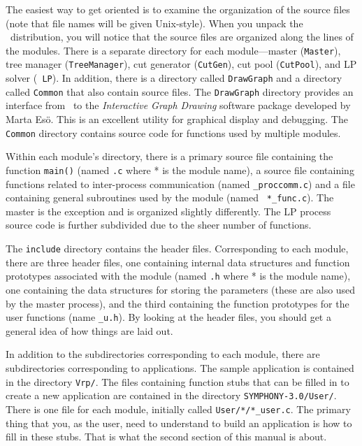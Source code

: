 The easiest way to get oriented is to examine the organization of the source
files (note that file names will be given Unix-style). When you unpack the
\BB\ distribution, you will notice that the source files are organized along
the lines of the modules.  There is a separate directory for each
module---master ({\tt Master}), tree manager ({\tt TreeManager}), cut
generator ({\tt CutGen}), cut pool ({\tt CutPool}), and LP solver ({\tt
LP}). In addition, there is a directory called {\tt DrawGraph} and a directory
called {\tt Common} that also contain source files. The {\tt DrawGraph}
directory provides an interface from \BB\ to the {\em Interactive Graph
Drawing} software package developed by Marta Es\"o. This is an excellent
utility for graphical display and debugging. The {\tt Common} directory
contains source code for functions used by multiple modules.

Within each module's directory, there is a primary source file
containing the function {\tt main()} (named {\tt *.c} where * is the
module name), a source file containing functions related to
inter-process communication (named {\tt *\_proccomm.c}) and a file
containing general subroutines used by the module (named {\tt
*\_func.c}). The master is the exception and is organized slightly
differently. The LP process source code is further subdivided due to
the sheer number of functions.

The {\tt include} directory contains the header files. Corresponding
to each module, there are three header files, one containing internal
data structures and function prototypes associated with the module
(named {\tt *.h} where * is the module name), one containing the data
structures for storing the parameters (these are also used by the
master process), and the third containing the function prototypes for
the user functions (name {\tt *\_u.h}). By looking at the header files, you
should get a general idea of how things are laid out.

In addition to the subdirectories corresponding to each module, there are
subdirectories corresponding to applications. The sample application is
contained in the directory {\tt Vrp/}. The files containing function stubs
that can be filled in to create a new application are contained in the
directory {\tt SYMPHONY-3.0/User/}. There is one file for each module,
initially called {\tt User/*/*\_user.c}. The primary thing that
you, as the user, need to understand to build an application is how to fill in
these stubs. That is what the second section of this manual is about.

